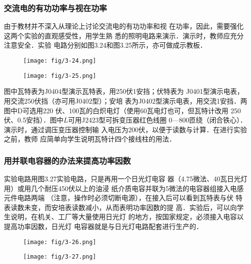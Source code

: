 \subsubsection{交流电的有功功率与视在功率}
由于教材并不深入从理论上讨论交流电的有功功率和视
在功率，因此，需要强化这两个实验的直观感受性，用学生熟
悉的照明电路来演示．演示时，教师应充分注意安全．实验
电路分别如图3.24和图3.25所示，亦可做成示教板．
\begin{figure}[htp]
    \centering
\texttt{[image: fig/3-24.png]}
    \caption{}
\end{figure}

\begin{figure}[htp]
    \centering
\texttt{[image: fig/3-25.png]}
    \caption{}
\end{figure}

图中瓦特表为J0404型演示瓦特表，用250伏1安挡；伏特表为
J0401型演示电表，用交流250伏挡（亦可用J0402型）；安培
表为J0402型演示电表，用交流1安挡．两图中D可选用220
伏、100瓦的白炽电灯（使用60瓦电灯也可，但瓦特计改用
250伏、0.5安挡）．图中$L$可用J2423型可拆变压器红色线圈
0—800匝绕（闭合铁心）．演示时，通过调压变压器控制输
入电压为200伏，以便于读数与计算．在进行实验之前，教师
应简单向学生说明瓦特计四个接线柱的用法．

\subsubsection{用并联电容器的办法来提高功率因数}
实验电路用图3.27实验电路，只是再用一个日光灯电容
器（4.75微法、40瓦日光灯用）或用几个耐压450伏以上的油浸
纸介质电容并联为5微法的电容器组接入电感元件电路两端
（注意，操作时必须切断电源），在接入后可以看到瓦特表与伏
特表读数未变，而安培表读数减小，从而表明功率因数的提
高．实验后，可以向学生说明，在机关、工厂等大量使用日光灯
的地方，按国家规定，必须接入电容以提高功率因数，日光灯
电容器就是与日光灯电路配套进行生产的．
\begin{figure}[htp]\centering
    \begin{minipage}[t]{0.48\textwidth}
    \centering
\texttt{[image: fig/3-26.png]}
    \caption{}
    \end{minipage}
    \begin{minipage}[t]{0.48\textwidth}
    \centering
\texttt{[image: fig/3-27.png]}
    \caption{}
    \end{minipage}
    \end{figure}

